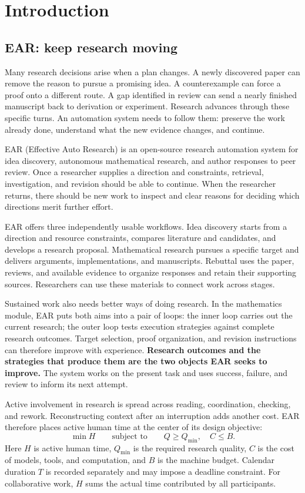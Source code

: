 \section{Introduction}
\label{sec:introduction}
\subsection{EAR: keep research moving}
\label{sec:position}
Many research decisions arise when a plan changes. A newly discovered paper can remove the reason to pursue a promising idea. A counterexample can force a proof onto a different route. A gap identified in review can send a nearly finished manuscript back to derivation or experiment. Research advances through these specific turns. An automation system needs to follow them: preserve the work already done, understand what the new evidence changes, and continue.

EAR (Effective Auto Research) is an open-source research automation system for idea discovery, autonomous mathematical research, and author responses to peer review. Once a researcher supplies a direction and constraints, retrieval, investigation, and revision should be able to continue. When the researcher returns, there should be new work to inspect and clear reasons for deciding which directions merit further effort.

EAR offers three independently usable workflows. Idea discovery starts from a direction and resource constraints, compares literature and candidates, and develops a research proposal. Mathematical research pursues a specific target and delivers arguments, implementations, and manuscripts. Rebuttal uses the paper, reviews, and available evidence to organize responses and retain their supporting sources. Researchers can use these materials to connect work across stages.

Sustained work also needs better ways of doing research. In the mathematics module, EAR puts both aims into a pair of loops: the inner loop carries out the current research; the outer loop tests execution strategies against complete research outcomes. Target selection, proof organization, and revision instructions can therefore improve with experience. \textbf{Research outcomes and the strategies that produce them are the two objects EAR seeks to improve.} The system works on the present task and uses success, failure, and review to inform its next attempt.

Active involvement in research is spread across reading, coordination, checking, and rework. Reconstructing context after an interruption adds another cost. EAR therefore places active human time at the center of its design objective:
\begin{equation}
\min H\qquad \text{subject to}\qquad Q\ge Q_{\min},\quad C\le B.
\label{eq:human-objective}
\end{equation}
Here $H$ is active human time, $Q_{\min}$ is the required research quality, $C$ is the cost of models, tools, and computation, and $B$ is the machine budget. Calendar duration $T$ is recorded separately and may impose a deadline constraint. For collaborative work, $H$ sums the actual time contributed by all participants.

